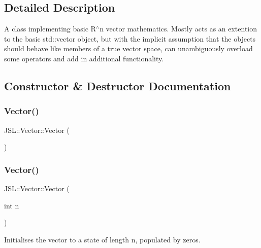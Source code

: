 \subsection{Detailed Description}
A class implementing basic R$^\wedge$n vector mathematics. Mostly acts as an extention to the basic std\+::vector object, but with the implicit assumption that the objects should behave like members of a true vector space, can unambiguously overload some operators and add in additional functionality. 

\subsection{Constructor \& Destructor Documentation}
\mbox{\label{classJSL_1_1Vector_a840fca607f8eae7dea1494b2954d3a3c}} 
\subsubsection{\texorpdfstring{Vector()}{Vector()}\hspace{0.1cm}{\footnotesize\ttfamily [1/3]}}
{\footnotesize\ttfamily J\+S\+L\+::\+Vector\+::\+Vector (\begin{DoxyParamCaption}{ }\end{DoxyParamCaption})\hspace{0.3cm}{\ttfamily [inline]}}

\mbox{\label{classJSL_1_1Vector_aea8654ed3fb875d43f669a5f2e26fb25}} 
\subsubsection{\texorpdfstring{Vector()}{Vector()}\hspace{0.1cm}{\footnotesize\ttfamily [2/3]}}
{\footnotesize\ttfamily J\+S\+L\+::\+Vector\+::\+Vector (\begin{DoxyParamCaption}\item[{int}]{n }\end{DoxyParamCaption})\hspace{0.3cm}{\ttfamily [inline]}}



Initialises the vector to a state of length n, populated by zeros. 


